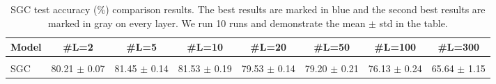 \begin{table}[t]
\centering
\caption{SGC test accuracy (\%) comparison results. The best results are marked in blue and the second best results are marked in gray on every layer. We run 10 runs and demonstrate the mean $\pm$ std in the table.} %
\begin{adjustbox}{width=0.99\textwidth}
\begin{tabular}{lccccccc}
\toprule
 Model             & \#L=2              & \#L=5              & \#L=10             & \#L=20             & \#L=50        & \#L=100    & \#L=300    \\
\midrule
\rowcolor{gray!8}\multicolumn{8}{c}{\textit{Cora}~\citep{cora}}\\
\midrule
 SGC      & 80.21 {\footnotesize $\pm$ 0.07}& 81.45 {\footnotesize $\pm$ 0.14 }& 81.53 {\footnotesize $\pm$ 0.19 }& 79.53 {\footnotesize $\pm$ 0.14 }& 79.20 {\footnotesize $\pm$ 0.21 }& 76.13 {\footnotesize $\pm$ 0.24 }& 65.64 {\footnotesize $\pm$ 1.15 }\\


\end{tabular}
\end{adjustbox}
\end{table}
